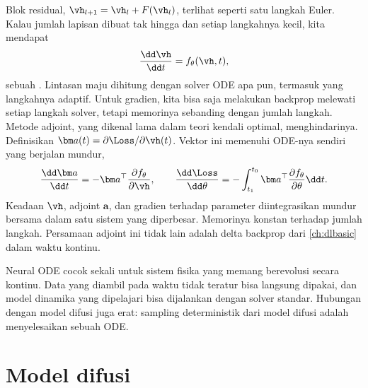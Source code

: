 Blok residual, $\vh_{l+1}=\vh_l+F(\vh_l)$, terlihat seperti satu langkah Euler. Kalau jumlah
lapisan dibuat tak hingga dan setiap langkahnya kecil, kita mendapat
\begin{equation}
\frac{\dd\vh}{\dd t}=f_\theta(\vh,t),
\end{equation}
sebuah  \citep{chen2018}. Lintasan maju dihitung dengan solver ODE apa pun,
termasuk yang langkahnya adaptif. Untuk gradien, kita bisa saja melakukan backprop melewati setiap
langkah solver, tetapi memorinya sebanding dengan jumlah langkah. Metode adjoint, yang dikenal lama
dalam teori kendali optimal, menghindarinya. Definisikan $\bm a(t)=\partial\Loss/\partial\vh(t)$.
Vektor ini memenuhi ODE-nya sendiri yang berjalan mundur,
\begin{equation}
\frac{\dd\bm a}{\dd t}=-\bm a^\top\frac{\partial f_\theta}{\partial\vh},\qquad
\frac{\dd\Loss}{\dd\theta}=-\int_{t_1}^{t_0}\bm a^\top\frac{\partial f_\theta}{\partial\theta}\dd t.
\end{equation}
Keadaan $\vh$, adjoint $\bm a$, dan gradien terhadap parameter diintegrasikan mundur bersama dalam
satu sistem yang diperbesar. Memorinya konstan terhadap jumlah langkah. Persamaan adjoint ini tidak
lain adalah delta backprop dari \cref{ch:dlbasic} dalam waktu kontinu.

Neural ODE cocok sekali untuk sistem fisika yang memang berevolusi secara kontinu. Data yang
diambil pada waktu tidak teratur bisa langsung dipakai, dan model dinamika yang dipelajari bisa
dijalankan dengan solver standar. Hubungan dengan model difusi juga erat: sampling deterministik
dari model difusi adalah menyelesaikan sebuah ODE.

\section{Model difusi}

